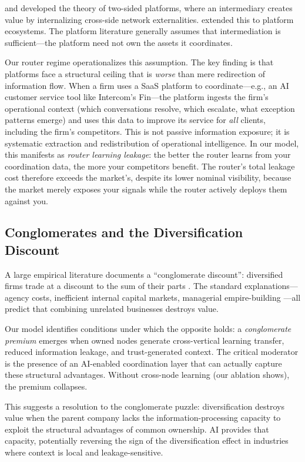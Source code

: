 \documentclass[12pt]{article}
\theoremstyle{definition}
\begin{document}
\citet{rochet2003} and \citet{armstrong2006} developed the theory of two-sided platforms, where an intermediary creates value by internalizing cross-side network externalities. \citet{parker2016} extended this to platform ecosystems. The platform literature generally assumes that intermediation is sufficient---the platform need not own the assets it coordinates.

Our router regime operationalizes this assumption. The key finding is that platforms face a structural ceiling that is \textit{worse} than mere redirection of information flow. When a firm uses a SaaS platform to coordinate---e.g., an AI customer service tool like Intercom's Fin---the platform ingests the firm's operational context (which conversations resolve, which escalate, what exception patterns emerge) and uses this data to improve its service for \textit{all} clients, including the firm's competitors. This is not passive information exposure; it is systematic extraction and redistribution of operational intelligence. In our model, this manifests as \textit{router learning leakage}: the better the router learns from your coordination data, the more your competitors benefit. The router's total leakage cost therefore exceeds the market's, despite its lower nominal visibility, because the market merely exposes your signals while the router actively deploys them against you.

\subsection{Conglomerates and the Diversification Discount}

A large empirical literature documents a ``conglomerate discount'': diversified firms trade at a discount to the sum of their parts \citep{berger1995, lang1994}. The standard explanations---agency costs, inefficient internal capital markets, managerial empire-building \citep{jensen1986}---all predict that combining unrelated businesses destroys value.

Our model identifies conditions under which the opposite holds: a \textit{conglomerate premium} emerges when owned nodes generate cross-vertical learning transfer, reduced information leakage, and trust-generated context. The critical moderator is the presence of an AI-enabled coordination layer that can actually capture these structural advantages. Without cross-node learning (our ablation shows), the premium collapses.

This suggests a resolution to the conglomerate puzzle: diversification destroys value when the parent company lacks the information-processing capacity to exploit the structural advantages of common ownership. AI provides that capacity, potentially reversing the sign of the diversification effect in industries where context is local and leakage-sensitive.
\end{document}
